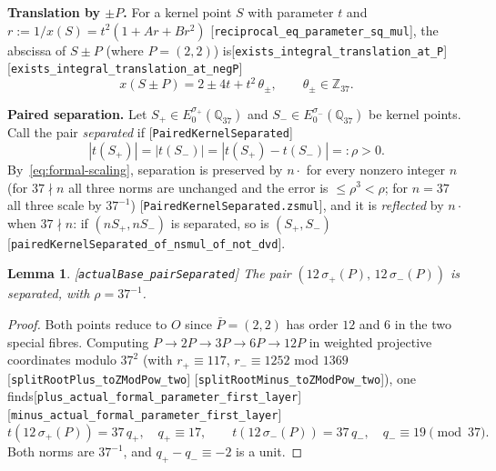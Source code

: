 \documentclass[10pt]{article}
\newtheorem{lemma}[theorem]{Lemma}
\theoremstyle{definition}
\theoremstyle{remark}
\newcommand{\Q}{\mathbb{Q}}
\newcommand{\Z}{\mathbb{Z}}
\newcommand{\Oinf}{O}
\newcommand{\leanref}[1]{{\scriptsize\textup{[\texttt{#1}]}}\allowbreak}
\begin{document}
\medskip\noindent\textbf{Translation by $\pm P$.}
For a kernel point $S$ with parameter $t$ and $r:=1/x(S)=t^2(1+Ar+Br^2)$
\leanref{reciprocal\_\allowbreak eq\_\allowbreak parameter\_\allowbreak sq\_\allowbreak mul}, the abscissa of $S\pm P$ (where
$P=(2,2)$) is\leanref{exists\_\allowbreak integral\_\allowbreak translation\_\allowbreak at\_\allowbreak P} \leanref{exists\_\allowbreak integral\_\allowbreak translation\_\allowbreak at\_\allowbreak neg\allowbreak P}
\begin{equation}\label{eq:translation}
 x(S\pm P)=2\pm4t+t^2\,\theta_\pm,\qquad \theta_\pm\in\Z_{37} .
\end{equation}

\medskip\noindent\textbf{Paired separation.}
Let $S_+\in E_0^{\sigma_+}(\Q_{37})$ and $S_-\in E_0^{\sigma_-}(\Q_{37})$ be
kernel points.  Call the pair \emph{separated} if
\leanref{Paired\allowbreak Kernel\allowbreak Separated}
\[
 |t(S_+)|=|t(S_-)|=|t(S_+)-t(S_-)|=:\rho>0 .
\]
By~\eqref{eq:formal-scaling}, separation is preserved by $n\cdot$ for every
nonzero integer $n$ (for $37\nmid n$ all three norms are unchanged and the
error is $\le\rho^3<\rho$; for $n=37$ all three scale by $37^{-1}$)
\leanref{Paired\allowbreak Kernel\allowbreak Separated.zsmul}, and it is \emph{reflected} by $n\cdot$
when $37\nmid n$: if $(nS_+,nS_-)$ is separated, so is $(S_+,S_-)$
\leanref{paired\allowbreak Kernel\allowbreak Separated\_\allowbreak of\_\allowbreak nsmul\_\allowbreak of\_\allowbreak not\_\allowbreak dvd}.

\begin{lemma}\label{lem:base-separated}
\leanref{actual\allowbreak Base\_\allowbreak pair\allowbreak Separated}
The pair $(12\,\sigma_+(P),\,12\,\sigma_-(P))$ is separated, with $\rho=37^{-1}$.
\end{lemma}
\begin{proof}
Both points reduce to $\Oinf$ since $\bar P=(2,2)$ has order $12$ and $6$ in
the two special fibres.  Computing $P\to2P\to3P\to6P\to12P$ in weighted
projective coordinates modulo $37^2$ (with $r_+\equiv117$, $r_-\equiv1252$
mod $1369$\leanref{split\allowbreak Root\allowbreak Plus\_\allowbreak to\allowbreak ZMod\allowbreak Pow\_\allowbreak two} \leanref{split\allowbreak Root\allowbreak Minus\_\allowbreak to\allowbreak ZMod\allowbreak Pow\_\allowbreak two}),
one finds\leanref{plus\_\allowbreak actual\_\allowbreak formal\_\allowbreak parameter\_\allowbreak first\_\allowbreak layer} \leanref{minus\_\allowbreak actual\_\allowbreak formal\_\allowbreak parameter\_\allowbreak first\_\allowbreak layer}
\[
 t(12\,\sigma_+(P))=37\,q_+,\quad q_+\equiv17,\qquad
 t(12\,\sigma_-(P))=37\,q_-,\quad q_-\equiv19\pmod{37}.
\]
Both norms are $37^{-1}$, and $q_+-q_-\equiv-2$ is a unit.
\end{proof}
\end{document}
